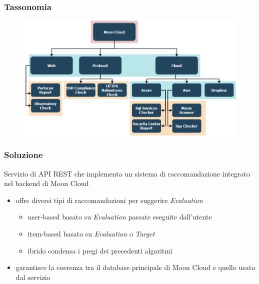 \begin{frame}
    \frametitle{Tassonomia}
    \begin{figure}
        \centering
        \includegraphics[scale=0.35]{images/MC_Rec_Tree2}
    \end{figure}
\end{frame}

\begin{frame}
    \frametitle{Soluzione}
    Servizio di \alert{API REST} che implementa un \alert{sistema di raccomandazione} \alert{integrato} nel \alert{backend} di Moon Cloud
    \begin{itemize}
        \item offre diversi tipi di raccomandazioni per \alert{suggerire \textit{Evaluation}}
        \begin{itemize}
            \item \alert{user-based} basato su \textit{Evaluation} passate eseguite dall'utente%
            \item \alert{item-based} basato su \textit{Evaluation} o \textit{Target}%
            \item \alert{ibrido} condensa i pregi dei precedenti algoritmi%
        \end{itemize}
        \item garantisce la \alert{coerenza} tra il database principale di Moon Cloud e quello usato dal servizio
    \end{itemize}
\end{frame}

